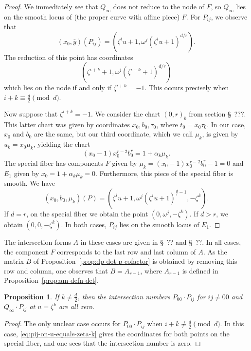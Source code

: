 \documentclass[reqno]{amsart}
\newtheorem{proposition}[thm]{Proposition}
\theoremstyle{definition}
\theoremstyle{remark}
\begin{document}
\begin{proof}
  We immediately see that $Q_\infty$ does not reduce to the node of $F$, so $Q_\infty$ lies on the smooth locus of (the proper curve with affine piece) $F$. For $P_{ij}$, we observe that
  \[
  (x_0, \bar{y})(P_{ij}) = (\zeta^i u + 1, \omega^j (\zeta^i u + 1)^{d/r}).
  \]
  The reduction of this point has coordinates
  \begin{equation}
    (\zeta^{i+k} + 1, \omega^j(\zeta^{i+k} + 1)^{d/r})\label{eq:pij-on-u-equals-zeta-k}
  \end{equation}
    which lies on the node if and only if $\zeta^{i+k} = -1$. This occurs precisely when $i + k \equiv \frac{d}{2} \pmod{d}$.

  Now suppose that $\zeta^{i+k} = -1$. We consider the chart $(0,r)_b$ from section \S~???. This latter chart was given by coordinates $x_0, b_0, \tau_0$, where $t_0 = x_0 \tau_0$. In our case, $x_0$ and $b_0$ are the same, but our third coordinate, which we call $\mu_k$, is given by $u_k = x_0 \mu_k$, yielding the chart
  \[
  (x_0 - 1)x_0^{r-2}b_0^r = 1 + \alpha_k \mu_k.
  \]
  The special fiber has components $F$ given by $\mu_k = (x_0 - 1)x_0^{r-2}b_0^r - 1 = 0$ and $E_1$ given by $x_0 = 1 + \alpha_k \mu_k = 0$. Furthermore, this piece of the special fiber is smooth. We have
  \[
  (x_0, b_0, \mu_k)(P) = (\zeta^iu + 1, \omega^j(\zeta^i u + 1)^{\frac{d}{r} - 1}, -\zeta^k).
  \]
  If $d = r$, on the special fiber we obtain the point $(0, \omega^j, -\zeta^k)$. If $d > r$, we obtain $(0, 0, -\zeta^k)$. In both cases, $P_{ij}$ lies on the smooth locus of $E_1$.
\end{proof}

The intersection forms $A$ in these cases are given in \S~?? and \S~??. In all cases, the component $F$ corresponds to the last row and last column of $A$. As the matrix $B$ of Proposition~\ref{prop:dp-dot-p-cofactor} is obtained by removing this row and column, one observes that $B = A_{r-1}$, where $A_{r-1}$ is defined in Proposition~\ref{prop:am-defn-det}.

\begin{proposition}\label{prop:local-intersections-u-zeta-k}
  If $k \neq \frac{d}{2}$, then the intersection numbers $P_{00} \cdot P_{ij}$ for $ij \neq 00$ and $Q_{\infty} \cdot P_{ij}$ at $u = \zeta^k$ are all zero.
\end{proposition} 

\begin{proof}
  The only unclear case occurs for $P_{00} \cdot P_{ij}$ when $i + k \not\equiv \frac{d}{2} \pmod{d}$. In this case, \eqref{eq:pij-on-u-equals-zeta-k} gives the coordinates for both points on the special fiber, and one sees that the intersection number is zero.
\end{proof}
\end{document}
